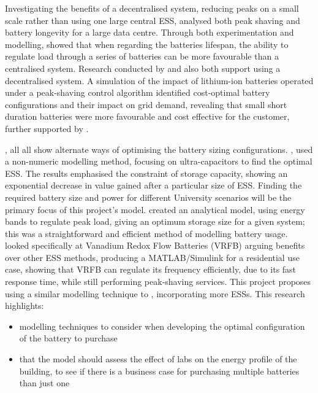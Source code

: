 Investigating the benefits of a decentralised system, reducing peaks on
a small scale rather than using one large central ESS, \cite{6604477}
analysed both peak shaving and battery longevity for a large data
centre. Through both experimentation and modelling, \cite{6604477}
showed that when regarding the batteries lifespan, the ability to
regulate load through a series of batteries can be more favourable than
a centralised system. Research conducted by \cite{6348200} and
\cite{Demonstr51:online} also both support using a decentralised system.
A simulation of the impact of lithium-ion batteries operated under a
peak-shaving control algorithm identified cost-optimal battery
configurations and their impact on grid demand, revealing that small
short duration batteries were more favourable and cost effective for the
customer, further supported by \cite{20164002874437}.

\cite{20160601898032}, \cite{Levron201280} all \cite{5371839} all show
alternate ways of optimising the battery sizing configurations.
\cite{5371839}, used a non-numeric modelling method, focusing on
ultra-capacitors to find the optimal ESS. The results emphasised the
constraint of storage capacity, showing an exponential decrease in value
gained after a particular size of ESS. Finding the required battery size
and power for different University scenarios will be the primary focus
of this project's model. \cite{Levron201280} created an analytical
model, using energy bands to regulate peak load, giving an optimum
storage size for a given system; this was a straightforward and
efficient method of modelling battery usage. \cite{20160601898032}
looked specifically at Vanadium Redox Flow Batteries (VRFB) arguing
benefits over other ESS methods, producing a MATLAB/Simulink for a
residential use case, showing that VRFB can regulate its frequency
efficiently, due to its fast response time, while still performing
peak-shaving services. This project proposes using a similar modelling
technique to \cite{20160601898032}, incorporating more ESSs. This
research highlights:

\begin{itemize}
\tightlist
\item
  modelling techniques to consider when developing the optimal
  configuration of the battery to purchase
\item
  that the model should assess the effect of labs on the energy profile
  of the building, to see if there is a business case for purchasing
  multiple batteries than just one
\end{itemize}

